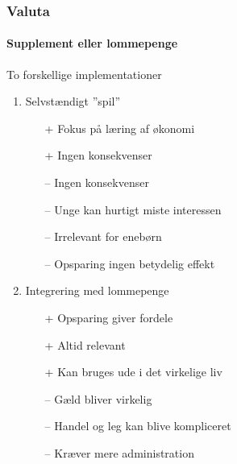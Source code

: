 
\newcommand{\bad}{{\color{red}--}}
\newcommand{\good}{{\color{ForestGreen}+}}

\begin{frame}
\frametitle{Valuta}
\framesubtitle{Supplement eller lommepenge} %
    To forskellige implementationer
    \pause
    \begin{multicols}{2}
        \begin{enumerate}
            \item{Selvstændigt ''spil''}
            \begin{itemize}
                \item[\good]{Fokus på læring af økonomi}
                \item[\good]{Ingen konsekvenser}
                \item[\bad]{Ingen konsekvenser}
                \item[\bad]{Unge kan hurtigt miste interessen}
                \item[\bad]{Irrelevant for enebørn}
                \item[\bad]{Opsparing ingen betydelig effekt}
            \end{itemize}
            \pause
            \columnbreak 
            \item{Integrering med lommepenge}
            \begin{itemize}
                \item[\good]{Opsparing giver fordele}
                \item[\good]{Altid relevant}
                \item[\good]{Kan bruges ude i det virkelige liv}
                \item[\bad]{Gæld bliver virkelig}
                \item[\bad]{Handel og leg kan blive kompliceret}
                \item[\bad]{Kræver mere administration}
            \end{itemize}
        \end{enumerate}
    \end{multicols}
\end{frame}
    
